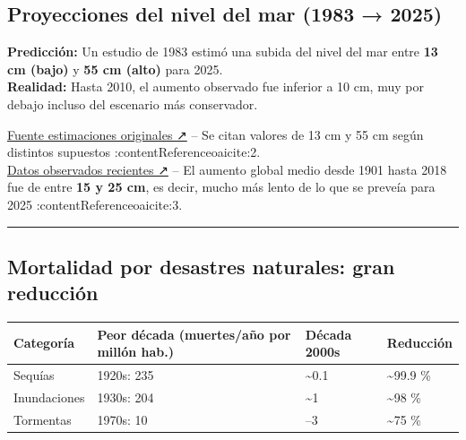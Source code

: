 \documentclass[
  11pt,
  a4paper,
  DIV=11,
  numbers=noendperiod]{scrreprt}
\begin{document}
\subsection{Proyecciones del nivel del mar (1983 →
2025)}\label{proyecciones-del-nivel-del-mar-1983-2025}

\textbf{Predicción:} Un estudio de 1983 estimó una subida del nivel del
mar entre \textbf{13 cm (bajo)} y \textbf{55 cm (alto)} para 2025.\\
\textbf{Realidad:} Hasta 2010, el aumento observado fue inferior a 10
cm, muy por debajo incluso del escenario más conservador.

\href{https://papers.risingsea.net/federal_reports/Ocean_City_Titus_Leatherman_Everts_Kriebel_Dean.pdf}{Fuente
estimaciones originales ↗} -- Se citan valores de 13 cm y 55 cm según
distintos supuestos :contentReference{oaicite:2}.\\
\href{https://en.wikipedia.org/wiki/Sea_level_rise}{Datos observados
recientes ↗} -- El aumento global medio desde 1901 hasta 2018 fue de
entre \textbf{15 y 25 cm}, es decir, mucho más lento de lo que se
preveía para 2025 :contentReference{oaicite:3}.

\begin{center}\rule{0.5\linewidth}{0.5pt}\end{center}

\subsection{Mortalidad por desastres naturales: gran
reducción}\label{mortalidad-por-desastres-naturales-gran-reducciuxf3n}

\begin{longtable}[]{@{}
  >{\raggedright\arraybackslash}p{}
  >{\raggedright\arraybackslash}p{}
  >{\raggedright\arraybackslash}p{}
  >{\raggedright\arraybackslash}p{}@{}}
\toprule\noalign{}
\begin{minipage}[b]{\linewidth}\raggedright
Categoría
\end{minipage} & \begin{minipage}[b]{\linewidth}\raggedright
Peor década (muertes/año por millón hab.)
\end{minipage} & \begin{minipage}[b]{\linewidth}\raggedright
Década 2000s
\end{minipage} & \begin{minipage}[b]{\linewidth}\raggedright
Reducción
\end{minipage} \\
\midrule\noalign{}
\endhead
\bottomrule\noalign{}
\endlastfoot
Sequías & 1920s: 235 & \textasciitilde0.1 & \textasciitilde99.9 \% \\
Inundaciones & 1930s: 204 & \textasciitilde1 & \textasciitilde98 \% \\
Tormentas & 1970s: 10 & 2--3 & \textasciitilde75 \% \\
\end{longtable}
\end{document}
